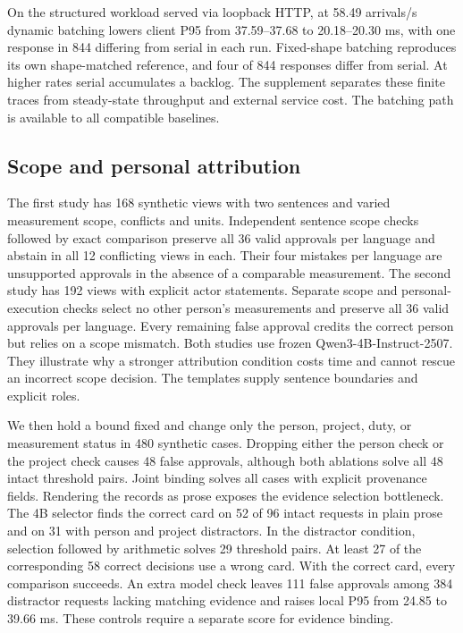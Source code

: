 On the structured workload served via loopback HTTP, at 58.49 arrivals/s dynamic batching lowers client P95 from 37.59--37.68 to 20.18--20.30 ms, with one response in 844 differing from serial in each run. Fixed-shape batching reproduces its own shape-matched reference, and four of 844 responses differ from serial. At higher rates serial accumulates a backlog. The supplement separates these finite traces from steady-state throughput and external service cost. The batching path is available to all compatible baselines.

\subsection{Scope and personal attribution}
The first study has 168 synthetic views with two sentences and varied measurement scope, conflicts and units. Independent sentence scope checks followed by exact comparison preserve all 36 valid approvals per language and abstain in all 12 conflicting views in each. Their four mistakes per language are unsupported approvals in the absence of a comparable measurement. The second study has 192 views with explicit actor statements. Separate scope and personal-execution checks select no other person's measurements and preserve all 36 valid approvals per language. Every remaining false approval credits the correct person but relies on a scope mismatch. Both studies use frozen Qwen3-4B-Instruct-2507. They illustrate why a stronger attribution condition costs time and cannot rescue an incorrect scope decision. The templates supply sentence boundaries and explicit roles.

We then hold a bound fixed and change only the person, project, duty, or measurement status in 480 synthetic cases. Dropping either the person check or the project check causes 48 false approvals, although both ablations solve all 48 intact threshold pairs. Joint binding solves all cases with explicit provenance fields. Rendering the records as prose exposes the evidence selection bottleneck. The 4B selector finds the correct card on 52 of 96 intact requests in plain prose and on 31 with person and project distractors. In the distractor condition, selection followed by arithmetic solves 29 threshold pairs. At least 27 of the corresponding 58 correct decisions use a wrong card. With the correct card, every comparison succeeds. An extra model check leaves 111 false approvals among 384 distractor requests lacking matching evidence and raises local P95 from 24.85 to 39.66 ms. These controls require a separate score for evidence binding.

